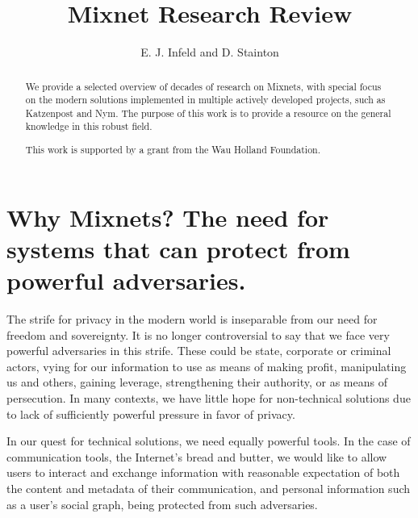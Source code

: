 \documentclass{article}
\title{Mixnet Research Review}
\author{E. J. Infeld and D. Stainton}
\begin{document}
\maketitle
\begin{abstract}
\noindent We provide a selected overview of decades of research on Mixnets, with special focus on the modern solutions implemented in multiple actively developed projects, such as Katzenpost and Nym. The purpose of this work is to provide a resource on the general knowledge in this robust field. \smallskip

\noindent This work is supported by a grant from the Wau Holland Foundation.

\end{abstract}

\tableofcontents
\vfill

\section{Why Mixnets? The need for systems that can protect from powerful adversaries.}

The strife for privacy in the modern world is inseparable from our need for freedom and sovereignty. It is no longer controversial to say that we face very powerful adversaries in this strife. These could be state, corporate or criminal actors, vying for our information to use as means of making profit, manipulating us and others, gaining leverage, strengthening their authority, or as means of persecution. In many contexts, we have little hope for non-technical solutions due to lack of sufficiently powerful pressure in favor of privacy.

In our quest for technical solutions, we need equally powerful tools. In the case of communication tools, the Internet's bread and butter, we would like to allow users to interact and exchange information with reasonable expectation of both the content and metadata of their communication, and personal information such as a user's social graph, being protected from such adversaries. %
\end{document}
